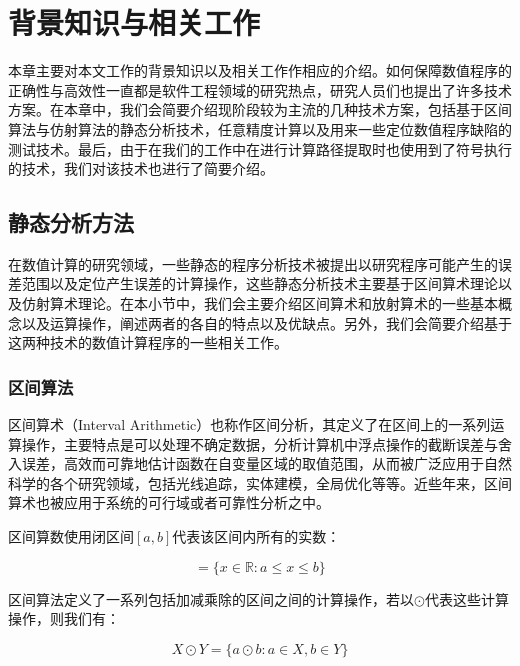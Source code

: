 \chapter{背景知识与相关工作}\label{chapter_related_work}

本章主要对本文工作的背景知识以及相关工作作相应的介绍。如何保障数值程序的正确性与高效性一直都是软件工程领域的研究热点，研究人员们也提出了许多技术方案。在本章中，我们会简要介绍现阶段较为主流的几种技术方案，包括基于区间算法与仿射算法的静态分析技术，任意精度计算以及用来一些定位数值程序缺陷的测试技术。最后，由于在我们的工作中在进行计算路径提取时也使用到了符号执行的技术，我们对该技术也进行了简要介绍。

\section{静态分析方法}
在数值计算的研究领域，一些静态的程序分析技术被提出以研究程序可能产生的误差范围以及定位产生误差的计算操作，这些静态分析技术主要基于区间算术理论以及仿射算术理论。在本小节中，我们会主要介绍区间算术和放射算术的一些基本概念以及运算操作，阐述两者的各自的特点以及优缺点。另外，我们会简要介绍基于这两种技术的数值计算程序的一些相关工作。

\subsection{区间算法}

区间算术（Interval Arithmetic）也称作区间分析，其定义了在区间上的一系列运算操作，主要特点是可以处理不确定数据，分析计算机中浮点操作的截断误差与舍入误差，高效而可靠地估计函数在自变量区域的取值范围，从而被广泛应用于自然科学的各个研究领域，包括光线追踪，实体建模，全局优化等等。近些年来，区间算术也被应用于系统的可行域或者可靠性分析之中。

区间算数使用闭区间$[a, b]$代表该区间内所有的实数：

\begin{equation*}
    [a, b] = \{x \in \mathbb{R} : a \leq x \leq b \}
\end{equation*}

区间算法定义了一系列包括加减乘除的区间之间的计算操作，若以$\odot$代表这些计算操作，则我们有：

\begin{equation*}
    X \odot Y = \{ a \odot b : a \in X , b \in Y \}
\end{equation*}

